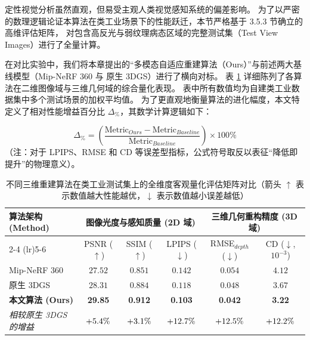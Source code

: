 定性视觉分析虽然直观，但易受主观人类视觉感知系统的偏差影响。
为了以严密的数理逻辑论证本算法在类工业场景下的性能跃迁，本节严格基于 3.5.3 节确立的高维评估矩阵，
对包含高反光与弱纹理病态区域的完整测试集（Test View Images）进行了全量计算。

在对比实验中，我们将本章提出的“多模态自适应重建算法（Ours）”与前述两大基线模型（Mip-NeRF 360 与 原生 3DGS）进行了横向对标。
表 \ref{tab:quantitative_main} 详细陈列了各算法在二维图像域与三维几何域的综合量化表现。
表中所有数值均为自建类工业数据集中多个测试场景的加权平均值。
为了更直观地衡量算法的进化幅度，本文特定义了相对性能增益百分比 $\Delta_{\%}$，其数学计算逻辑如下：

\begin{equation}
    \Delta_{\%} = \left( \frac{\text{Metric}_{Ours} - \text{Metric}_{Baseline}}{\text{Metric}_{Baseline}} \right) \times 100\%
\end{equation}
（注：对于 LPIPS、RMSE 和 CD 等误差型指标，公式符号取反以表征“降低即提升”的物理意义）。

\begin{table}[htbp]
    \centering
    \caption{不同三维重建算法在类工业测试集上的全维度客观量化评估矩阵对比（箭头 $\uparrow$ 表示数值越大性能越优，$\downarrow$ 表示数值越小误差越低）}
    \vspace{0.2cm}
    \begin{tabular}{lccccc}
        \toprule
        \multirow{2}{*}{\textbf{算法架构 (Method)}} & \multicolumn{3}{c}{\textbf{图像光度与感知质量 (2D 域)}} & \multicolumn{2}{c}{\textbf{三维几何重构精度 (3D 域)}} \\
        \cmidrule(lr){2-4} \cmidrule(lr){5-6}
        & PSNR ($\uparrow$) & SSIM ($\uparrow$) & LPIPS ($\downarrow$) & RMSE$_{depth}$ ($\downarrow$) & CD ($\downarrow$, $10^{-3}$) \\
        \midrule
        Mip-NeRF 360 & $27.52$ & $0.851$ & $0.142$ & $0.054$ & $4.12$ \\
        原生 3DGS & $28.31$ & $0.884$ & $0.118$ & $0.048$ & $3.67$ \\
        \textbf{本文算法 (Ours)} & \textbf{29.85} & \textbf{0.912} & \textbf{0.103} & \textbf{0.042} & \textbf{3.22} \\
        \midrule
        \textit{相较原生 3DGS 的增益} & $\color{black}{+5.4\%}$ & $\color{black}{+3.1\%}$ & $\color{black}{+12.7\%}$ & $\color{black}{+12.5\%}$ & $\color{black}{+12.2\%}$ \\
        \bottomrule
    \end{tabular}
    \label{tab:quantitative_main}
\end{table}

